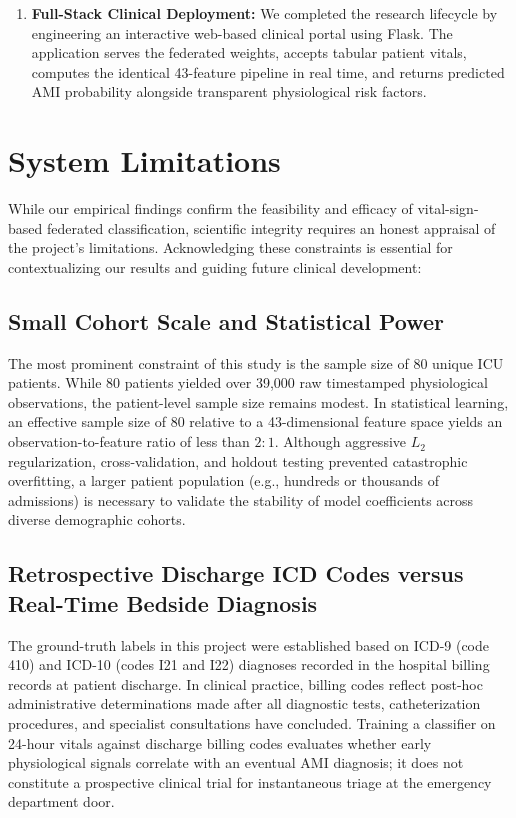 \begin{enumerate}
    \item \textbf{Full-Stack Clinical Deployment:} We completed the research lifecycle by engineering an interactive web-based clinical portal using Flask. The application serves the federated weights, accepts tabular patient vitals, computes the identical 43-feature pipeline in real time, and returns predicted AMI probability alongside transparent physiological risk factors.
\end{enumerate}

\section{System Limitations}
\label{sec:system_limitations}

While our empirical findings confirm the feasibility and efficacy of vital-sign-based federated classification, scientific integrity requires an honest appraisal of the project's limitations. Acknowledging these constraints is essential for contextualizing our results and guiding future clinical development:

\subsection{Small Cohort Scale and Statistical Power}
The most prominent constraint of this study is the sample size of 80 unique ICU patients. While 80 patients yielded over 39,000 raw timestamped physiological observations, the patient-level sample size remains modest. In statistical learning, an effective sample size of 80 relative to a 43-dimensional feature space yields an observation-to-feature ratio of less than $2:1$. Although aggressive $L_2$ regularization, cross-validation, and holdout testing prevented catastrophic overfitting, a larger patient population (e.g., hundreds or thousands of admissions) is necessary to validate the stability of model coefficients across diverse demographic cohorts.

\subsection{Retrospective Discharge ICD Codes versus Real-Time Bedside Diagnosis}
The ground-truth labels in this project were established based on ICD-9 (code 410) and ICD-10 (codes I21 and I22) diagnoses recorded in the hospital billing records at patient discharge. In clinical practice, billing codes reflect post-hoc administrative determinations made after all diagnostic tests, catheterization procedures, and specialist consultations have concluded. Training a classifier on 24-hour vitals against discharge billing codes evaluates whether early physiological signals correlate with an eventual AMI diagnosis; it does not constitute a prospective clinical trial for instantaneous triage at the emergency department door.

